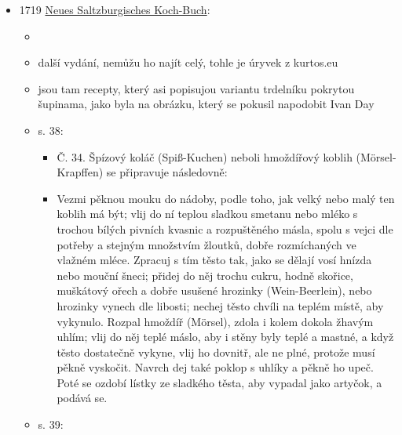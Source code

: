 \begin{itemize}
  \begin{itemize}
  \tightlist
  \item
  \item
    s. 228: obrázek Brügel- oder Spiess- Krapffen Dorten
  \item
    je to obrázek trdelníku kterej vypadá, jako kdyby byl sestavenej ze
    šupin, je kónickej a na vrcholu má ozdobu z květin.
  \item
    taky je tam obrázek kónický formy s klikou
  \item
    tímle obrázkem se inspirovali v roce 2025 na akci Kouzelný stůl na
    zámečku Belárie v Českým Krumově, kterej vedla Irena Korbelářová,
    která vede Filozoficko-přírodovědeckou fakultu v Opavě a je
    spoluautorkou Kulinárního dědictví Českých zemí
  \item
    vytvořili ale v zásadě standardní trdelník z pruhu těsta, Hagger ve
    skutečnosti měl recept na plát těsta s nádivkou
  \end{itemize}
\item
  1719
  \href{https://web.archive.org/web/20201229075636/http://www.kurtos.eu/dl/Salzburgisches_Koch-Buch.pdf}{Neues
  Saltzburgisches Koch-Buch}:

  \begin{itemize}
  \tightlist
  \item
  \item
    další vydání, nemůžu ho najít celý, tohle je úryvek z kurtos.eu
  \item
    jsou tam recepty, který asi popisujou variantu trdelníku pokrytou
    šupinama, jako byla na obrázku, který se pokusil napodobit Ivan Day
  \item
    s. 38:

    \begin{itemize}
    \tightlist
    \item
      Č. 34. Špízový koláč (Spiß-Kuchen) neboli hmoždířový koblih
      (Mörsel-Krapffen) se připravuje následovně:
    \item
      Vezmi pěknou mouku do nádoby, podle toho, jak velký nebo malý ten
      koblih má být; vlij do ní teplou sladkou smetanu nebo mléko s
      trochou bílých pivních kvasnic a rozpuštěného másla, spolu s vejci
      dle potřeby a stejným množstvím žloutků, dobře rozmíchaných ve
      vlažném mléce. Zpracuj s tím těsto tak, jako se dělají vosí hnízda
      nebo mouční šneci; přidej do něj trochu cukru, hodně skořice,
      muškátový ořech a dobře usušené hrozinky (Wein-Beerlein), nebo
      hrozinky vynech dle libosti; nechej těsto chvíli na teplém místě,
      aby vykynulo. Rozpal hmoždíř (Mörsel), zdola i kolem dokola žhavým
      uhlím; vlij do něj teplé máslo, aby i stěny byly teplé a mastné, a
      když těsto dostatečně vykyne, vlij ho dovnitř, ale ne plné,
      protože musí pěkně vyskočit. Navrch dej také poklop s uhlíky a
      pěkně ho upeč. Poté se ozdobí lístky ze sladkého těsta, aby
      vypadal jako artyčok, a podává se.
    \end{itemize}
  \item
    s. 39:


\end{itemize}
\end{itemize}
